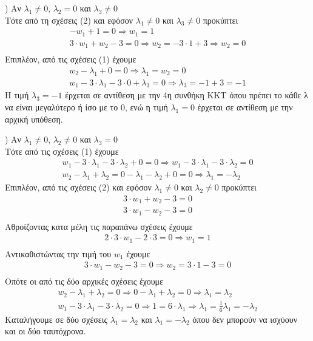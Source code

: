\documentclass{article}
\begin{document}
	) Αν $λ_{1} \ne 0$, $λ_{2} = 0$ και $λ_{3} \ne 0$\\
	Tότε από τη σχέσεις (2) και εφόσον $λ_{1} \ne 0 $ και $λ_{3} \ne 0 $ προκύπτει
	\begin{align*}
		-w_{1} + 1 = 0 \Rightarrow w_{1} = 1\\
		3 \cdot w_{1} + w_{2} - 3 = 0 \Rightarrow w_{2} = -3 \cdot 1 + 3 \Rightarrow w_{2} = 0\\
	\end{align*}
	Επιπλέον, από τις σχέσεις (1) έχουμε 
	\begin{align*}
		w_{2} - λ_{1} + 0 = 0 \Rightarrow λ_{1} = w_{2} = 0\\
		w_{1} - 3 \cdot λ_{1} - 3 \cdot 0 + λ_{3} = 0 \Rightarrow λ_{3} = -1 + 3 = -1
	\end{align*}
	\noindent
	Η τιμή $λ_{3} = -1$ έρχεται σε αντίθεση με την 4η συνθήκη ΚΚΤ όπου πρέπει το κάθε λ να είναι μεγαλύτερο ή ίσο με το 0, ενώ η τιμή $λ_{1} = 0$ έρχεται σε αντίθεση με την αρχική υπόθεση.
	
	) Αν $λ_{1} \ne 0$, $λ_{2} \ne 0$ και $λ_{3} = 0$\\
	Τότε από τις σχέσεις (1) έχουμε
	\begin{align*}
		w_{1} - 3 \cdot λ_{1} - 3 \cdot λ_{2} + 0 = 0 \Rightarrow w_{1} - 3 \cdot λ_{1} - 3 \cdot λ_{2} = 0\\
		w_{2} - λ_{1} + λ_{2} = 0
		- λ_{1} - λ_{2} + 0 = 0 \Rightarrow λ_{1} = - λ_{2}
	\end{align*}
	\noindent
	Eπιπλέον, από τις σχέσεις (2) και εφόσον $λ_{1} \ne 0 $ και $λ_{2} \ne 0 $ προκύπτει
	\begin{align*}
		3 \cdot w_{1} + w_{2} - 3 = 0 \\
		3 \cdot w_{1} - w_{2} - 3 = 0 \\
	\end{align*}
    \noindent
    Αθροίζοντας κατα μέλη τις παραπάνω σχέσεις έχουμε
    	\begin{align*}
    	2 \cdot 3 \cdot w_{1} - 2 \cdot 3 = 0 \Rightarrow w_{1} = 1 \\
    \end{align*}
	\noindent
	Αντικαθιστώντας την τιμή του $w_{1}$ έχουμε
	\begin{align*}
		3 \cdot w_{1} - w_{2} - 3 = 0 \Rightarrow  w_{2} = 3 \cdot 1 - 3 = 0\\
	\end{align*}
	\noindent
	Οπότε οι από τις δύο αρχικές σχέσεις έχουμε 
	\begin{align*}
		w_{2} - λ_{1} + λ_{2} = 0 \Rightarrow 0 - λ_{1} + λ_{2} = 0 \Rightarrow λ_{1} = λ_{2} \\
		w_{1} - 3 \cdot λ_{1} - 3 \cdot λ_{2} = 0 \Rightarrow 1 = 6 \cdot λ_{1} \Rightarrow λ_{1} = \frac{1}{6} 
		λ_{1} = - λ_{2}
	\end{align*}
	\noindent
	Καταλήγουμε σε δύο σχέσεις $λ_{1} = λ_{2}$ και $λ_{1} = -λ_{2}$ όπου δεν μπορούν να ισχύουν και οι δύο ταυτόχρονα.
	
\end{document}
